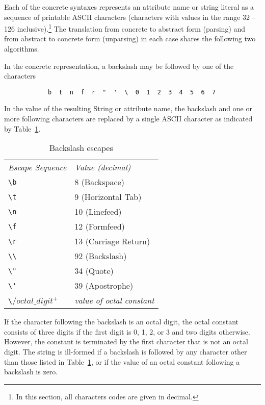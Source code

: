 \documentclass{article}
\begin{document}
Each of the concrete syntaxes represents an attribute name or string literal
as a sequence of printable ASCII characters (characters with values in the
range 32 -- 126 inclusive).\footnote{In this section, all characters codes are
given in decimal.}  The translation from concrete to abstract form (parsing)
and from abstract to concrete form (unparsing) in each case shares the
following two algorithms.

In the concrete representation, a backslash may be followed by one of the
characters
\begin{verbatim}
            b  t  n  f  r  "  '  \  0  1  2  3  4  5  6  7 
\end{verbatim}
In the value of the resulting String or attribute name, the backslash and
one or more following characters are replaced by a single ASCII character as
indicated by Table~\ref{tab:backslash}.

\begin{table}[htb!]
\begin{center}
\begin{tabular}{ll}
\emph{Escape Sequence} & \emph{Value (decimal)} \\
\verb/\b/ & 8 (Backspace) \\
\verb/\t/ & 9 (Horizontal Tab) \\
\verb/\n/ & 10 (Linefeed) \\
\verb/\f/ & 12 (Formfeed)  \\
\verb/\r/ & 13 (Carriage Return) \\
\verb/\\/ & 92 (Backslash)  \\
\verb/\"/ & 34 (Quote)  \\
\verb/\'/ & 39 (Apostrophe)  \\
\verb/\/$octal\_digit^+$ & \emph{value of octal constant}
\end{tabular}
\caption{Backslash escapes}
\label{tab:backslash}
\end{center}
\end{table}

If the character following the backslash is an octal digit, the octal constant
consists of three digits if the first digit is 0, 1, 2, or 3 and two digits
otherwise.  However, the constant is terminated by the first character that is
not an octal digit.  The string is ill-formed if a backslash is followed by any
character other than those listed in Table~\ref{tab:backslash}, or if the value
of an octal constant following a backslash is zero.
\end{document}
